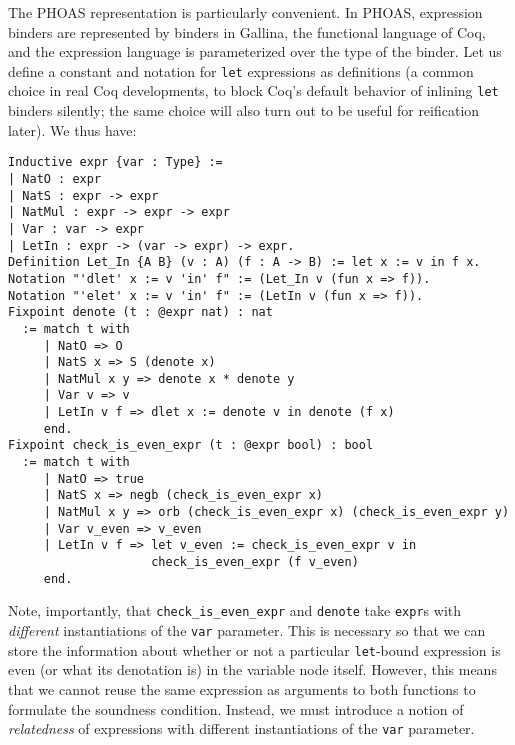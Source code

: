 The PHOAS representation is particularly convenient.
In PHOAS, expression binders are represented by binders in Gallina, the functional language of Coq, and the expression language is parameterized over the type of the binder.
Let us define a constant and notation for \texttt{let} expressions as definitions (a common choice in real Coq developments, to block Coq's default behavior of inlining \texttt{let} binders silently; the same choice will also turn out to be useful for reification later).
We thus have: \label{sec:phoas-expr-def}
\begin{verbatim}
Inductive expr {var : Type} :=
| NatO : expr
| NatS : expr -> expr
| NatMul : expr -> expr -> expr
| Var : var -> expr
| LetIn : expr -> (var -> expr) -> expr.
Definition Let_In {A B} (v : A) (f : A -> B) := let x := v in f x.
Notation "'dlet' x := v 'in' f" := (Let_In v (fun x => f)).
Notation "'elet' x := v 'in' f" := (LetIn v (fun x => f)).
Fixpoint denote (t : @expr nat) : nat
  := match t with
     | NatO => O
     | NatS x => S (denote x)
     | NatMul x y => denote x * denote y
     | Var v => v
     | LetIn v f => dlet x := denote v in denote (f x)
     end.
Fixpoint check_is_even_expr (t : @expr bool) : bool
  := match t with
     | NatO => true
     | NatS x => negb (check_is_even_expr x)
     | NatMul x y => orb (check_is_even_expr x) (check_is_even_expr y)
     | Var v_even => v_even
     | LetIn v f => let v_even := check_is_even_expr v in
                    check_is_even_expr (f v_even)
     end.
\end{verbatim}

Note, importantly, that \texttt{check_is_even_expr} and \texttt{denote} take \texttt{expr}s with \emph{different} instantiations of the \texttt{var} parameter.
This is necessary so that we can store the information about whether or not a particular \texttt{let}-bound expression is even (or what its denotation is) in the variable node itself.
However, this means that we cannot reuse the same expression as arguments to both functions to formulate the soundness condition.
Instead, we must introduce a notion of \emph{relatedness} of expressions with different instantiations of the \texttt{var} parameter.

